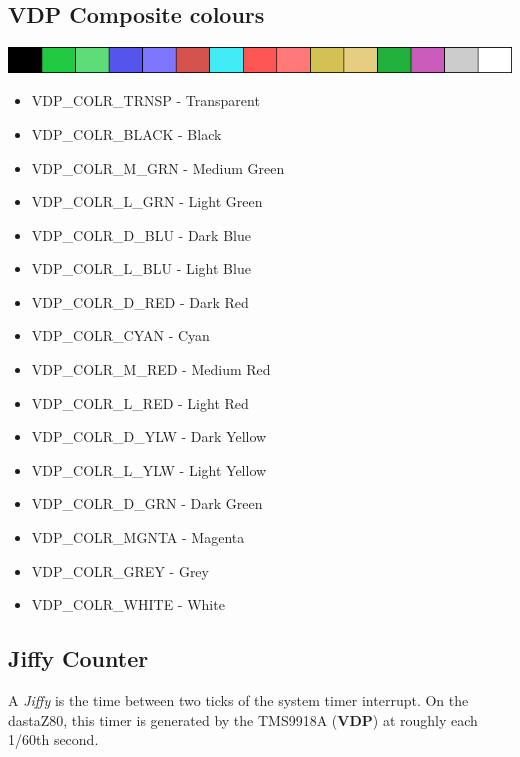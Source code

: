 \documentclass[a4paper,11pt]{article}
\begin{document}
    \subsection{VDP Composite colours}
    
    \includegraphics[scale=0.7]{TMS9918Apalette.png}

    \begin{itemize}
        \item VDP\_COLR\_TRNSP  - Transparent
        \item VDP\_COLR\_BLACK  - Black
        \item VDP\_COLR\_M\_GRN - Medium Green
        \item VDP\_COLR\_L\_GRN - Light Green
        \item VDP\_COLR\_D\_BLU - Dark Blue
        \item VDP\_COLR\_L\_BLU - Light Blue
        \item VDP\_COLR\_D\_RED - Dark Red
        \item VDP\_COLR\_CYAN   - Cyan
        \item VDP\_COLR\_M\_RED - Medium Red
        \item VDP\_COLR\_L\_RED - Light Red
        \item VDP\_COLR\_D\_YLW - Dark Yellow
        \item VDP\_COLR\_L\_YLW - Light Yellow
        \item VDP\_COLR\_D\_GRN - Dark Green
        \item VDP\_COLR\_MGNTA  - Magenta
        \item VDP\_COLR\_GREY   - Grey
        \item VDP\_COLR\_WHITE  - White
    \end{itemize}

    \subsection{Jiffy Counter}
    \label{subsec:jiffy_counter}

    A \textit{Jiffy} is the time between two ticks of the system timer interrupt.
    On the dastaZ80, this timer is generated by the TMS9918A (\textbf{VDP}) at
    roughly each 1/60th second.\\
\end{document}
